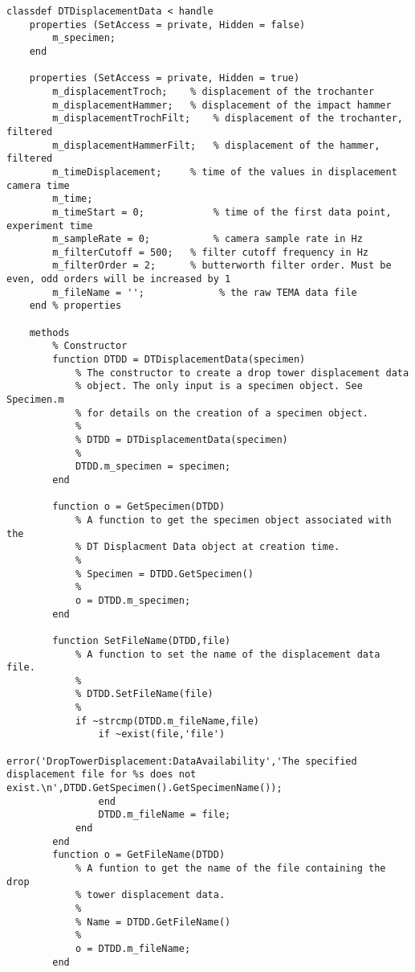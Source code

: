 \begin{lstlisting}
classdef DTDisplacementData < handle
    properties (SetAccess = private, Hidden = false)
        m_specimen;
    end
    
    properties (SetAccess = private, Hidden = true)
        m_displacementTroch;    % displacement of the trochanter
        m_displacementHammer;   % displacement of the impact hammer
        m_displacementTrochFilt;    % displacement of the trochanter, filtered
        m_displacementHammerFilt;   % displacement of the hammer, filtered
        m_timeDisplacement;     % time of the values in displacement camera time
        m_time;
        m_timeStart = 0;            % time of the first data point, experiment time
        m_sampleRate = 0;           % camera sample rate in Hz
        m_filterCutoff = 500;   % filter cutoff frequency in Hz
        m_filterOrder = 2;      % butterworth filter order. Must be even, odd orders will be increased by 1
        m_fileName = '';             % the raw TEMA data file
    end % properties
    
    methods
        % Constructor
        function DTDD = DTDisplacementData(specimen)
            % The constructor to create a drop tower displacement data
            % object. The only input is a specimen object. See Specimen.m
            % for details on the creation of a specimen object.
            %
            % DTDD = DTDisplacementData(specimen)
            %
            DTDD.m_specimen = specimen;
        end
        
        function o = GetSpecimen(DTDD)
            % A function to get the specimen object associated with the
            % DT Displacment Data object at creation time.
            %
            % Specimen = DTDD.GetSpecimen()
            %
            o = DTDD.m_specimen;
        end
        
        function SetFileName(DTDD,file)
            % A function to set the name of the displacement data file.
            %
            % DTDD.SetFileName(file)
            %
            if ~strcmp(DTDD.m_fileName,file)
                if ~exist(file,'file')
                    error('DropTowerDisplacement:DataAvailability','The specified displacement file for %s does not exist.\n',DTDD.GetSpecimen().GetSpecimenName());
                end
                DTDD.m_fileName = file;
            end
        end
        function o = GetFileName(DTDD)
            % A funtion to get the name of the file containing the drop
            % tower displacement data.
            %
            % Name = DTDD.GetFileName()
            %
            o = DTDD.m_fileName;
        end
        

\end{lstlisting}
